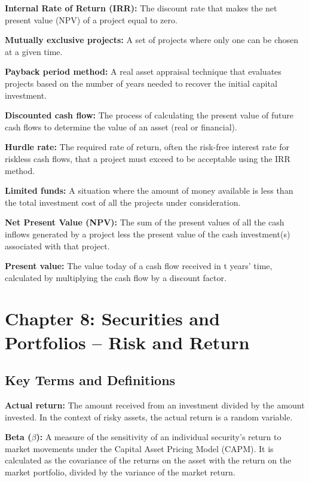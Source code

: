\documentclass[twoside,openany]{book}
\begin{document}
\textbf{Internal Rate of Return (IRR):} The discount rate that makes the net present value (NPV) of a project equal to zero.

\textbf{Mutually exclusive projects:} A set of projects where only one can be chosen at a given time.

\textbf{Payback period method:} A real asset appraisal technique that evaluates projects based on the number of years needed to recover the initial capital investment.

\textbf{Discounted cash flow:} The process of calculating the present value of future cash flows to determine the value of an asset (real or financial).

\textbf{Hurdle rate:} The required rate of return, often the risk-free interest rate for riskless cash flows, that a project must exceed to be acceptable using the IRR method.

\textbf{Limited funds:} A situation where the amount of money available is less than the total investment cost of all the projects under consideration.

\textbf{Net Present Value (NPV):} The sum of the present values of all the cash inflows generated by a project less the present value of the cash investment(s) associated with that project.

\textbf{Present value:} The value today of a cash flow received in t years' time, calculated by multiplying the cash flow by a discount factor.

\chapter*{Chapter 8: Securities and Portfolios – Risk and Return}

\section*{\textbf{Key Terms and Definitions}}

\textbf{Actual return:} The amount received from an investment divided by the amount invested. In the context of risky assets, the actual return is a random variable.

\textbf{Beta ($\beta$): } A measure of the sensitivity of an individual security's return to market movements under the Capital Asset Pricing Model (CAPM). It is calculated as the covariance of the returns on the asset with the return on the market portfolio, divided by the variance of the market return.
\end{document}
